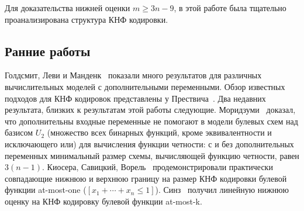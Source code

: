 Для доказательства нижней оценки $m \ge 3n - 9$, в этой работе была тщательно проанализирована структура КНФ кодировки.

\subsection{Ранние работы}
Голдсмит, Леви и Манденк~\cite{DBLP:journals/sigact/GoldsmithLM96} показали много результатов для различных вычислительных моделей с дополнительными переменными. 
Обзор известных подходов для КНФ кодировок представлены у Прествича~\cite{DBLP:series/faia/Prestwich09}.
Два недавних результата, близких к результатам этой работы следующие.
Моридзуми~\cite{DBLP:conf/cocoon/Morizumi15} доказал, что дополнительны входные переменные не помогают в модели булевых схем над базисом $U_2$ (множество всех бинарных функций, кроме эквивалентности и исключающего или) для вычисления функции четности: 
с и без дополнительных переменных минимальный размер схемы, вычисляющей функцию четности, равен $3(n - 1)$.
Киосера, Савицкий, Ворель~\cite{DBLP:journals/tcs/KuceraSV19} продемонстрировали практически совпадающие нижнюю и верхнюю границу на размер КНФ кодировки булевой функции at-most-one ($[x_1+\dotsb+x_n \le 1]$). Синз~\cite{DBLP:conf/cp/Sinz05} получил линейную нижнюю оценку на КНФ кодировку булевой функции at-most-k.
